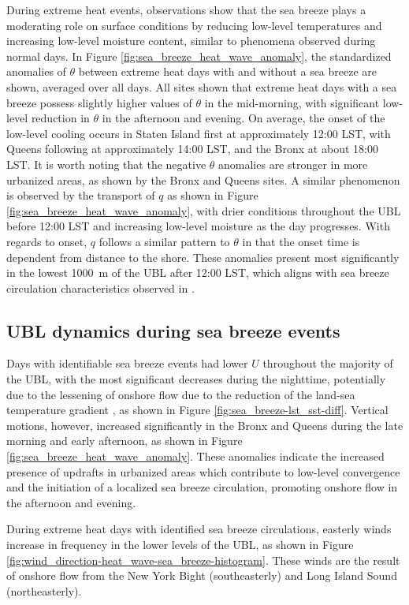 During extreme heat events, observations show that the sea breeze plays a moderating role on surface conditions by reducing low-level temperatures and increasing low-level moisture content, similar to phenomena observed during normal days. In Figure \ref{fig:sea_breeze_heat_wave_anomaly}, the standardized anomalies of $\theta$ between extreme heat days with and without a sea breeze are shown, averaged over all days. All sites shown that extreme heat days with a sea breeze possess slightly higher values of $\theta$ in the mid-morning, with significant low-level reduction in $\theta$ in the afternoon and evening. On average, the onset of the low-level cooling occurs in Staten Island first at approximately 12:00 LST, with Queens following at approximately 14:00 LST, and the Bronx at about 18:00 LST. It is worth noting that the negative $\theta$ anomalies are stronger in more urbanized areas, as shown by the Bronx and Queens sites. A similar phenomenon is observed by the transport of $q$ as shown in Figure \ref{fig:sea_breeze_heat_wave_anomaly}, with drier conditions throughout the UBL before 12:00 LST and increasing low-level moisture as the day progresses. With regards to onset, $q$ follows a similar pattern to $\theta$ in that the onset time is dependent from distance to the shore. These anomalies present most significantly in the lowest \SI{1000}{\meter} of the UBL after 12:00 LST, which aligns with sea breeze circulation characteristics observed in \citet{frizzola1963}.

\subsection{UBL dynamics during sea breeze events}
Days with identifiable sea breeze events had lower $U$ throughout the majority of the UBL, with the most significant decreases during the nighttime, potentially due to the lessening of onshore flow due to the reduction of the land-sea temperature gradient \citep{pullen2007}, as shown in Figure \ref{fig:sea_breeze-lst_sst-diff}. Vertical motions, however, increased significantly in the Bronx and Queens during the late morning and early afternoon, as shown in Figure \ref{fig:sea_breeze_heat_wave_anomaly}. These anomalies indicate the increased presence of updrafts in urbanized areas which contribute to low-level convergence and the initiation of a localized sea breeze circulation, promoting onshore flow in the afternoon and evening.

During extreme heat days with identified sea breeze circulations, easterly winds increase in frequency in the lower levels of the UBL, as shown in Figure \ref{fig:wind_direction-heat_wave-sea_breeze-histogram}. These winds are the result of onshore flow from the New York Bight (southeasterly) and Long Island Sound (northeasterly). 

